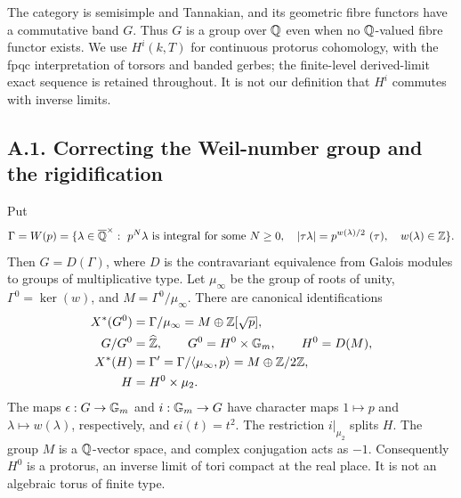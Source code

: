 The category is semisimple and Tannakian, and its geometric fibre
functors have a commutative band $G$. Thus $G$ is a group over $\mathbb Q$
even when no $\mathbb Q$-valued fibre functor exists. We use $H^i(k,T)$ for
continuous protorus cohomology, with the fpqc interpretation of torsors
and banded gerbes; the finite-level derived-limit exact sequence is
retained throughout. It is not our definition that $H^i$ commutes with
inverse limits.

\subsection{A.1. Correcting the Weil-number group and the rigidification}

\begin{theorem}
\label{A:band}
Put
\[
 \Gamma=W(p)=\{\lambda\in\overline{\mathbb Q}^{\times}:\
  p^N\lambda\text{ is integral for some }N\geq0,
  \quad |\tau\lambda|=p^{w(\lambda)/2}\ (\tau),\quad
  w(\lambda)\in\mathbb Z\}.
\]
Then $G=D(\Gamma)$, where $D$ is the contravariant equivalence from
Galois modules to groups of multiplicative type. Let $\mu_\infty$
be the group of roots of unity, $\Gamma^0=\ker(w)$, and
$M=\Gamma^0/\mu_\infty$. There are canonical identifications
\begin{align*}
 X^*(G^0)&=\Gamma/\mu_\infty=M\oplus\mathbb Z[\sqrt p],\\
 G/G^0&=\widehat{\mathbb Z},\qquad G^0=H^0\times{\mathbb G_m},
 \qquad H^0=D(M),\\
 X^*(H)&=\Gamma'=\Gamma/\langle\mu_\infty,p\rangle
            =M\oplus\mathbb Z/2\mathbb Z,\\
 H&=H^0\times\mu_2.
\end{align*}
The maps $\epsilon:G\to{\mathbb G_m}$ and $i:{\mathbb G_m}\to G$ have character
maps $1\mapsto p$ and $\lambda\mapsto w(\lambda)$, respectively,
and $\epsilon i(t)=t^2$. The restriction $i|_{\mu_2}$ splits $H$.
The group $M$ is a $\mathbb Q$-vector space, and complex conjugation acts
as $-1$. Consequently $H^0$ is a protorus, an inverse limit of tori
compact at the real place. It is not an algebraic torus of finite type.
\end{theorem}
